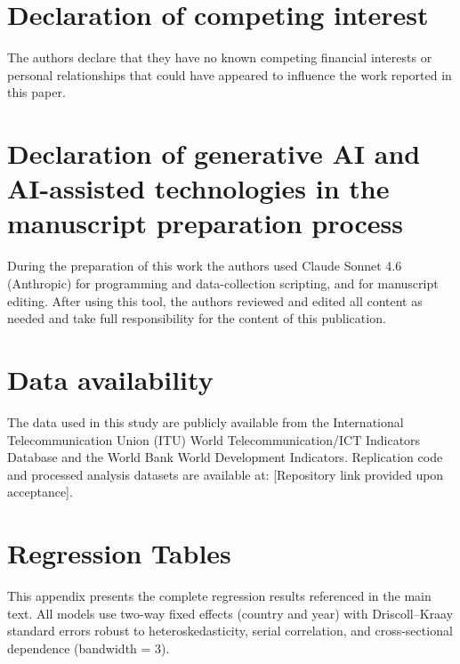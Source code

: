\documentclass[preprint,review,12pt,authoryear]{styles/elsarticle}
\begin{document}
\section*{Declaration of competing interest}
The authors declare that they have no known competing financial interests or
personal relationships that could have appeared to influence the work reported
in this paper.

\section*{Declaration of generative AI and AI-assisted technologies in the
manuscript preparation process}
During the preparation of this work the authors used Claude Sonnet 4.6
(Anthropic) for programming and data-collection scripting, and for manuscript
editing. After using this tool, the authors reviewed and edited all content as
needed and take full responsibility for the content of this publication.

\section*{Data availability}
The data used in this study are publicly available from the International
Telecommunication Union (ITU) World Telecommunication/ICT Indicators Database
and the World Bank World Development Indicators. Replication code and processed
analysis datasets are available at: [Repository link provided upon acceptance].





\clearpage
\appendix
\enlargethispage{4\baselineskip}

\section{Regression Tables}
\label{app:tables}
\setcounter{table}{0}
\small
\singlespacing
{\small\noindent This appendix presents the complete regression results referenced
in the main text. All models use two-way fixed effects (country and year) with
Driscoll--Kraay standard errors robust to heteroskedasticity, serial correlation,
and cross-sectional dependence (bandwidth = 3).}
\vspace{-4pt}
\end{document}
